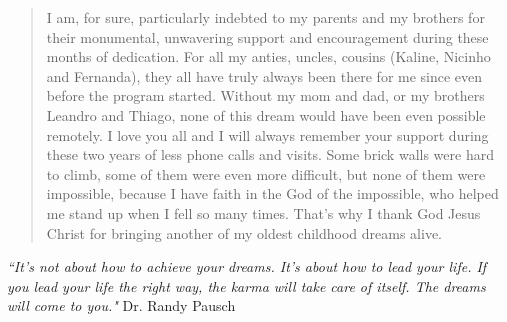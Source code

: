 \documentclass[12pt,oneside]{sfsuthesis}
\theoremstyle{plain} %
\theoremstyle{definition}  %
\theoremstyle{remark}  %
\begin{document}
\begin{quote}
\medskip

I am, for sure, particularly indebted to my parents and my brothers for their
monumental, unwavering support and encouragement during these months of
dedication. For all my anties, uncles, cousins (Kaline, Nicinho and
Fernanda), they all have truly always been there for me since even before the
program started. Without my mom and dad, or my brothers Leandro and Thiago,
none of this dream would have been even possible remotely. I love you all and
I will always remember your support during these two years of less phone calls
and visits. Some brick walls were hard to climb, some of them were even more
difficult, but none of them were impossible, because I have faith in the God
of the impossible, who helped me stand up when I fell so many times. That's
why I thank God Jesus Christ for bringing another of my oldest childhood
dreams alive.
\end{quote}

\textit{``It's not about how to achieve your dreams. It's about how to lead
your life. If you lead your life the right way, the karma will take care of
itself. The dreams will come to you."} Dr. Randy Pausch

\renewcommand{\contentsname}{\vspace{-1.7in} \begin{center} \normalsize \rm TABLE OF CONTENTS \end{center}}
\renewcommand{\listfigurename}{\vspace{-1.7in} \begin{center} \normalsize \rm LIST OF FIGURES \end{center}}
\renewcommand{\listtablename}{\vspace{-1.7in} \begin{center} \normalsize \rm LIST OF TABLES \end{center}}
\renewcommand{\cftchapfont}{\normalfont}
\renewcommand{\cftchappagefont}{\normalfont}
\renewcommand{\cftchapleader}{\cftdotfill{\cftdotsep}} %
\renewcommand{\cftsecfont}{\normalfont}
\renewcommand{\cftsecpagefont}{\normalfont}
\renewcommand{\cftsecleader}{\cftdotfill{\cftdotsep}}

\newpage \tableofcontents 
\newpage \listoftables %
\newpage \listoffigures %

\newpage
\pagestyle{myheadings}
\setcounter{page}{1}
\end{document}
